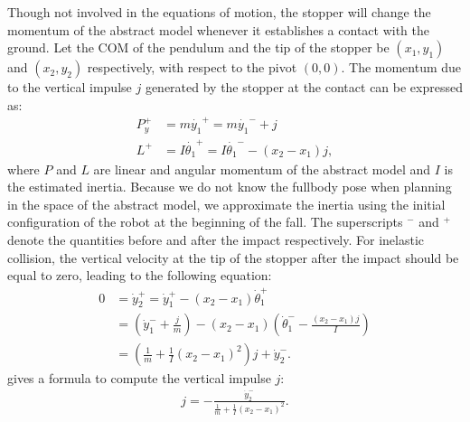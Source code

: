   Though not involved in the equations of motion, the stopper will
  change the momentum of the abstract model whenever it establishes a
  contact with the ground. Let the COM of the pendulum and the tip of
  the stopper be $(x_1, y_1)$ and $(x_2, y_2)$ respectively, with
  respect to the pivot $(0, 0)$.  The momentum due to the vertical
  impulse $j$ generated by the stopper at the contact can be expressed
  as:
  \begin{equation}
    \begin{aligned}
      P_y^+ &= m\dot{y_1}^+ = m\dot{y_1}^- + j \\
      L^+ &=  I\dot{\theta_1}^+ = I\dot{\theta_1}^- - (x_2 - x_1)j,
    \end{aligned}
  \end{equation}
  where $P$ and $L$ are linear and angular momentum of the abstract
  model and $I$ is the estimated inertia. Because we do not know the
  fullbody pose when planning in the space of the abstract model, we
  approximate the inertia using the initial configuration of the robot
  at the beginning of the fall. The superscripts $^-$ and $^+$ denote
  the quantities before and after the impact respectively. For
  inelastic collision, the vertical velocity at the tip of the stopper
  after the impact should be equal to zero, leading to the following
  equation:
  \begin{equation}
    \label{eq:falling_impulse0}
    \begin{aligned}
      0 &= \dot{y}_2^+ = \dot{y}_1^+ - (x_2 - x_1)\dot{\theta}_1^+ \\
      &= (\dot{y}_1^- + \frac{j}{m}) - (x_2 - x_1)(\dot{\theta}_1^- - \frac{(x_2 - x_1)j}{I}) \\
      &= (\frac{1}{m} + \frac{1}{I}(x_2 - x_1)^2) j + \dot{y}_2^-.
    \end{aligned}
  \end{equation}
 gives a formula to compute the vertical
impulse $j$:
  \begin{equation}
    \begin{aligned}
      j = -\frac{\dot{y}_2^-}{\frac{1}{m} + \frac{1}{I}(x_2 - x_1)^2}.
      \label{eq:falling_impulse1}
    \end{aligned}
  \end{equation}

